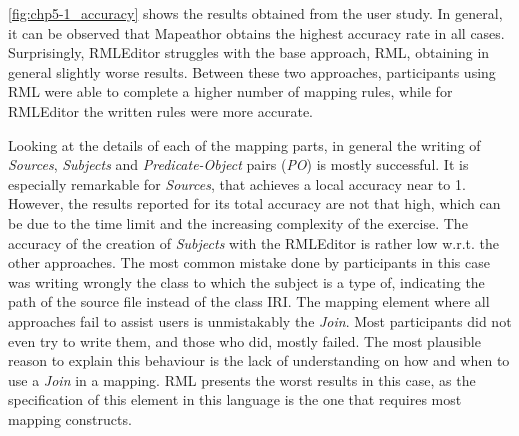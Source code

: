 \cref{fig:chp5-1_accuracy} shows the results obtained from the user study. In general, it can be observed that Mapeathor obtains the highest accuracy rate in all cases. Surprisingly, RMLEditor struggles with the base approach, RML, obtaining in general slightly worse results. Between these two approaches, participants using RML were able to complete a higher number of mapping rules, while for RMLEditor the written rules were more accurate. 

Looking at the details of each of the mapping parts, in general the writing of \textit{Sources}, \textit{Subjects} and \textit{Predicate-Object} pairs (\textit{PO}) is mostly successful. 
It is especially remarkable for \textit{Sources}, that achieves a local accuracy near to 1. 
However, the results reported for its total accuracy are not that high, which can be due to the time limit and the increasing complexity of the exercise. 
The accuracy of the creation of \textit{Subjects} with the RMLEditor is rather low w.r.t. the other approaches. 
The most common mistake done by participants in this case was writing wrongly the class to which the subject is a type of, indicating the path of the source file instead of the class IRI. 
The mapping element where all approaches fail to assist users is unmistakably the \textit{Join}. 
Most participants did not even try to write them, and those who did, mostly failed. The most plausible reason to explain this behaviour is the lack of understanding on how and when to use a \textit{Join} in a mapping. 
RML presents the worst results in this case, as the specification of this element in this language is the one that requires most mapping constructs. 


